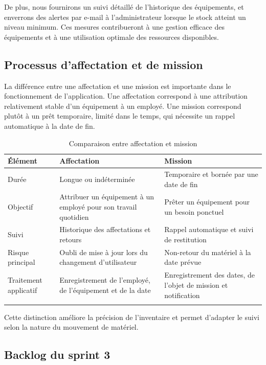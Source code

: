 De plus, nous fournirons un suivi détaillé de l'historique des équipements, et enverrons des alertes par e-mail à l'administrateur lorsque le stock atteint un niveau minimum. Ces mesures contribueront à une gestion efficace des équipements et à une utilisation optimale des ressources disponibles.

\subsection{Processus d'affectation et de mission}

La différence entre une affectation et une mission est importante dans le fonctionnement de l'application. Une affectation correspond à une attribution relativement stable d'un équipement à un employé. Une mission correspond plutôt à un prêt temporaire, limité dans le temps, qui nécessite un rappel automatique à la date de fin.

\begin{longtable}{|m{3.5cm}|m{5cm}|m{5cm}|}
\hline
\textbf{Élément} & \textbf{Affectation} & \textbf{Mission} \\
\hline
\endhead
\endfoot
\endlastfoot
\hline
Durée & Longue ou indéterminée & Temporaire et bornée par une date de fin \\
\hline
Objectif & Attribuer un équipement à un employé pour son travail quotidien & Prêter un équipement pour un besoin ponctuel \\
\hline
Suivi & Historique des affectations et retours & Rappel automatique et suivi de restitution \\
\hline
Risque principal & Oubli de mise à jour lors du changement d'utilisateur & Non-retour du matériel à la date prévue \\
\hline
Traitement applicatif & Enregistrement de l'employé, de l'équipement et de la date & Enregistrement des dates, de l'objet de mission et notification \\
\hline
\captionsetup{justification=centering,margin=1cm}
\caption{Comparaison entre affectation et mission}
\end{longtable}

Cette distinction améliore la précision de l'inventaire et permet d'adapter le suivi selon la nature du mouvement de matériel.

    \subsection{Backlog du sprint 3}

